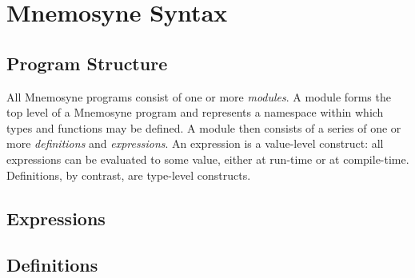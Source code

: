 %

\chapter{Mnemosyne Syntax}\label{app:grammar}

\section{Program Structure}

All Mnemosyne programs consist of one or more \textit{modules}. A module forms the top level of a Mnemosyne program and represents a namespace within which types and functions may be defined. A module then consists of a series of one or more \textit{definitions} and \textit{expressions}. An expression is a value-level construct: all expressions can be evaluated to some value, either at run-time or at compile-time. Definitions, by contrast, are type-level constructs.

\section{Expressions}

\section{Definitions}
